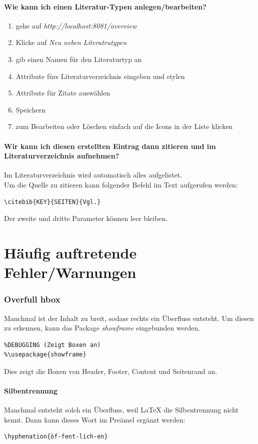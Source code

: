 \documentclass[12pt]{article}
\begin{document}
\subsection{Wie kann ich einen Literatur-Typen anlegen/bearbeiten?}
\begin{enumerate}
\item gehe auf \textit{http://localhost:8081/overview}
\item Klicke auf \textit{Neu neben Literatrutypen}
\item gib einen Namen für den Literaturtyp an
\item Attribute fürs Literaturverzeichnis eingeben und stylen
\item Attribute für Zitate auswählen
\item Speichern
\item zum Bearbeiten oder Löschen einfach auf die Icons in der Liste klicken
\end{enumerate}

\subsection{Wir kann ich diesen erstellten Eintrag dann zitieren und im Literaturverzeichnis aufnehmen?}
Im Literaturverzeichnis wird automatisch alles aufgelistet.\\[6pt]Um die Quelle zu zitieren kann folgender Befehl im Text aufgerufen werden:
\begin{verbatim}
\citebib{KEY}{SEITEN}{Vgl.}
\end{verbatim}
Der zweite und dritte Parameter können leer bleiben.

\part{Häufig auftretende Fehler/Warnungen}
\section{Overfull hbox}
Manchmal ist der Inhalt zu breit, sodass rechts ein Überfluss entsteht. Um diesen zu erkennen, kann das Package \textit{showframe}  eingebunden werden.
\begin{verbatim}
%DEBUGGING (Zeigt Boxen an)
%\usepackage{showframe}
\end{verbatim}
Dies zeigt die Boxen von Header, Footer, Content und Seitenrand an.
\subsection{Silbentrennung}
Manchmal entsteht solch ein Überfluss, weil LaTeX die Silbentrennung nicht kennt. Dann kann dieses Wort im Preämel ergänzt werden:
\begin{verbatim}
\hyphenation{öf-fent-lich-en}
\end{verbatim}
\end{document}

